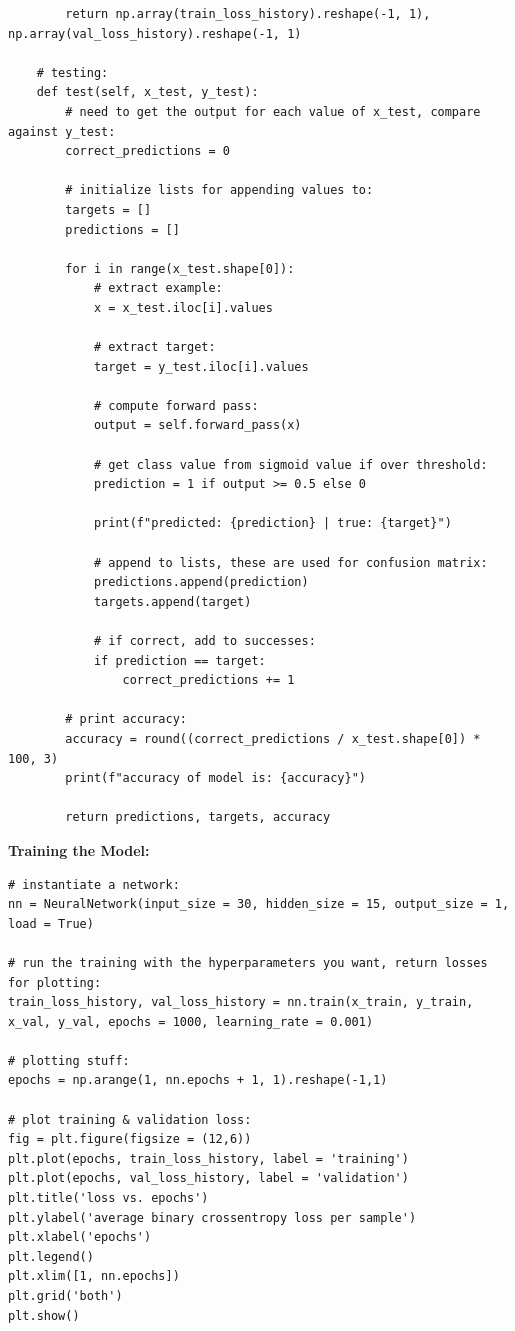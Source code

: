 \documentclass[a4paper]{article}
\begin{document}
\begin{lstlisting}
        return np.array(train_loss_history).reshape(-1, 1), np.array(val_loss_history).reshape(-1, 1)

    # testing:
    def test(self, x_test, y_test):
        # need to get the output for each value of x_test, compare against y_test:
        correct_predictions = 0

        # initialize lists for appending values to:
        targets = []
        predictions = []

        for i in range(x_test.shape[0]):
            # extract example:
            x = x_test.iloc[i].values

            # extract target:
            target = y_test.iloc[i].values

            # compute forward pass:
            output = self.forward_pass(x)

            # get class value from sigmoid value if over threshold:
            prediction = 1 if output >= 0.5 else 0

            print(f"predicted: {prediction} | true: {target}")

            # append to lists, these are used for confusion matrix:
            predictions.append(prediction)
            targets.append(target)

            # if correct, add to successes:
            if prediction == target:
                correct_predictions += 1

        # print accuracy:
        accuracy = round((correct_predictions / x_test.shape[0]) * 100, 3)
        print(f"accuracy of model is: {accuracy}")

        return predictions, targets, accuracy   
\end{lstlisting}

\textbf{Training the Model:}

\begin{lstlisting}
# instantiate a network:
nn = NeuralNetwork(input_size = 30, hidden_size = 15, output_size = 1, load = True)

# run the training with the hyperparameters you want, return losses for plotting:
train_loss_history, val_loss_history = nn.train(x_train, y_train, x_val, y_val, epochs = 1000, learning_rate = 0.001)

# plotting stuff:
epochs = np.arange(1, nn.epochs + 1, 1).reshape(-1,1)

# plot training & validation loss:
fig = plt.figure(figsize = (12,6))
plt.plot(epochs, train_loss_history, label = 'training')
plt.plot(epochs, val_loss_history, label = 'validation')
plt.title('loss vs. epochs')
plt.ylabel('average binary crossentropy loss per sample')
plt.xlabel('epochs')
plt.legend()
plt.xlim([1, nn.epochs])
plt.grid('both')
plt.show()
\end{lstlisting}
\end{document}
